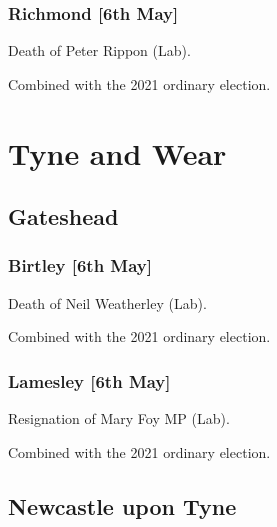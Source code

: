 \documentclass[a4paper,openany]{book}
\begin{document}
\begin{resultsiii}
\subsubsection*{Richmond \hspace*{\fill}\nolinebreak[1]%
	\enspace\hspace*{\fill}
	[6th May]}


Death of Peter Rippon (Lab).

Combined with the 2021 ordinary election.

\section{Tyne and Wear}

\subsection*{Gateshead}

\subsubsection*{Birtley \hspace*{\fill}\nolinebreak[1]%
	\enspace\hspace*{\fill}
	[6th May]}


Death of Neil Weatherley (Lab).

Combined with the 2021 ordinary election.

\subsubsection*{Lamesley \hspace*{\fill}\nolinebreak[1]%
	\enspace\hspace*{\fill}
	[6th May]}


Resignation of Mary Foy MP (Lab).

Combined with the 2021 ordinary election.

\subsection*{Newcastle upon Tyne}


\end{resultsiii}
\end{document}
